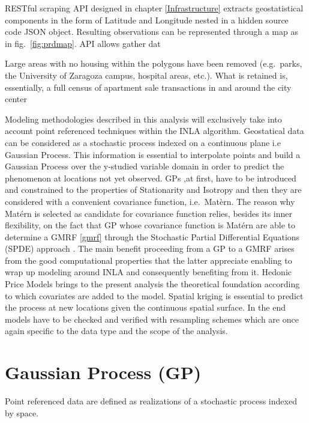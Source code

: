\documentclass[
  12pt,
  a4paper,
  oneside]{book}
\theoremstyle{definition}
\theoremstyle{definition}
\theoremstyle{definition}
\theoremstyle{remark}
\begin{document}
RESTful scraping API designed in chapter \ref{Infrastructure} extracts geostatistical components in the form of Latitude and Longitude nested in a hidden source code JSON object. Resulting observations can be represented through a map as in fig.~\ref{fig:prdmap}. API allows gather dat

Large areas with no housing within the polygons have
been removed (e.g.~parks, the University of Zaragoza campus, hospital areas, etc.). What is
retained is, essentially, a full census of apartment sale transactions in and around the city center

Modeling methodologies described in this analysis will exclusively take into account point referenced techniques within the INLA algorithm.
Geostatical data can be considered as a stochastic process indexed on a continuous plane \citep{arbia2012spatial} i.e Gaussian Process.
This information is essential to interpolate points and build a Gaussian Process over the y-studied variable domain in order to predict the phenomenon at locations not yet observed. GPs ,at first, have to be introduced and constrained to the properties of Stationarity and Isotropy and then they are considered with a convenient covariance function, i.e.~Matèrn. The reason why Matérn is selected as candidate for covariance function relies, besides its inner flexibility, on the fact that GP whose covariance function is Matérn are able to determine a GMRF \ref{gmrf} through the Stochastic Partial Differential Equations (SPDE) approach \citep{Lindren2011}. The main benefit proceeding from a GP to a GMRF arises from the good computational properties that the latter appreciate enabling to wrap up modeling around INLA and consequently benefiting from it. Hedonic Price Models brings to the present analysis the theoretical foundation according to which covariates are added to the model.
Spatial kriging is essential to predict the process at new locations given the continuous spatial surface.
In the end models have to be checked and verified with resampling schemes which are once again specific to the data type and the scope of the analysis.

\hypertarget{GP}{%
\section{Gaussian Process (GP)}\label{GP}}

Point referenced data are defined as realizations of a stochastic process indexed by space.
\end{document}
